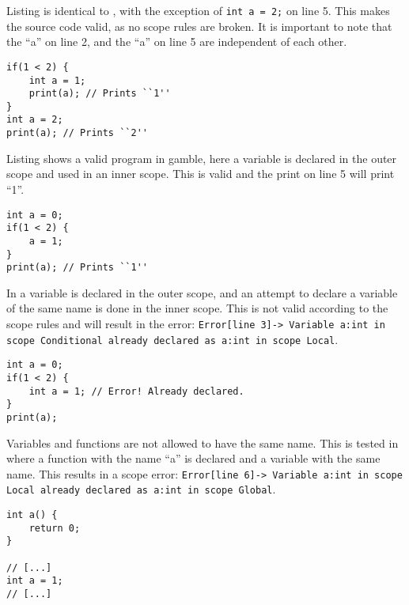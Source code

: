 Listing  is identical to , with the exception of \texttt{int a = 2;} on line 5.
This makes the source code valid, as no scope rules are broken.
It is important to note that the ``a'' on line 2, and the ``a'' on line 5 are independent of each other.

\begin{lstlisting}[caption={Example of a valid program in \gls{gamble}},label={lst:scope2},frame=tb]
if(1 < 2) {
    int a = 1;
    print(a); // Prints ``1''
}
int a = 2;
print(a); // Prints ``2''
\end{lstlisting}

Listing  shows a valid program in \gls{gamble}, here a variable is declared in the outer scope and used in an inner scope.
This is valid and the print on line 5 will print ``1''.

\begin{lstlisting}[caption={Example of a valid program in \gls{gamble}},label={lst:scope3},frame=tb]
int a = 0;
if(1 < 2) {
    a = 1;
}
print(a); // Prints ``1''
\end{lstlisting}

In  a variable is declared in the outer scope, and an attempt to declare a variable of the same name is done in the inner scope.
This is not valid according to the scope rules and will result in the error: \texttt{Error[line    3]-> Variable a:int in scope Conditional already declared as a:int in scope Local}.

\begin{lstlisting}[caption={Example of a redeclaration error in \gls{gamble}},label={lst:scope4},frame=tb]
int a = 0;
if(1 < 2) {
    int a = 1; // Error! Already declared.
}
print(a);
\end{lstlisting}

Variables and functions are not allowed to have the same name.
This is tested in  where a function with the name ``a'' is declared and a variable with the same name.
This results in a scope error: \texttt{Error[line    6]-> Variable a:int in scope Local already declared as a:int in scope Global}.

\begin{lstlisting}[caption={Example of a redeclaration error in \gls{gamble}},label={lst:scope5},frame=tb]
int a() {
    return 0;
}

// [...]
int a = 1;
// [...] 
\end{lstlisting}

